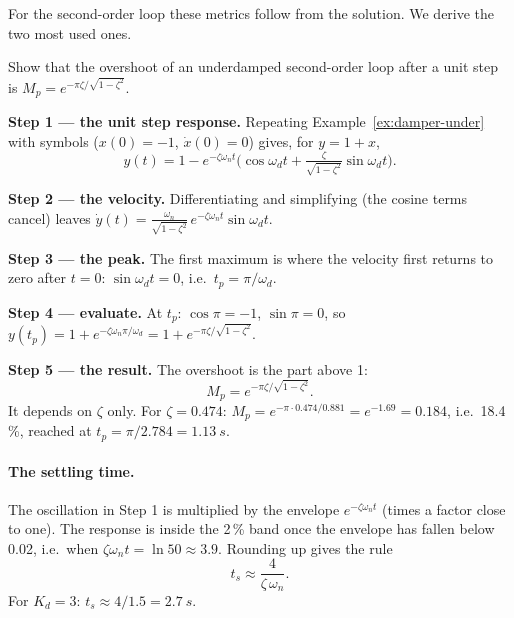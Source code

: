 For the second-order loop these metrics follow from the solution. We derive the two most used ones.

\begin{example}
\label{ex:damper-mp}
Show that the overshoot of an underdamped second-order loop after a unit step is $M_p = e^{-\pi\zeta/\sqrt{1-\zeta^2}}$.

\textbf{Step 1 — the unit step response.} Repeating Example~\ref{ex:damper-under} with symbols ($x(0) = -1$, $\dot x(0) = 0$) gives, for $y = 1 + x$,
\begin{equation*}
  y(t) = 1 - e^{-\zeta\omega_n t}\Big(\cos\omega_d t + \tfrac{\zeta}{\sqrt{1-\zeta^2}}\sin\omega_d t\Big).
\end{equation*}

\textbf{Step 2 — the velocity.} Differentiating and simplifying (the cosine terms cancel) leaves $\dot y(t) = \frac{\omega_n}{\sqrt{1-\zeta^2}}\,e^{-\zeta\omega_n t}\sin\omega_d t$.

\textbf{Step 3 — the peak.} The first maximum is where the velocity first returns to zero after $t = 0$: $\sin\omega_d t = 0$, i.e.\ $t_p = \pi/\omega_d$.

\textbf{Step 4 — evaluate.} At $t_p$: $\cos\pi = -1$, $\sin\pi = 0$, so $y(t_p) = 1 + e^{-\zeta\omega_n\pi/\omega_d} = 1 + e^{-\pi\zeta/\sqrt{1-\zeta^2}}$.

\textbf{Step 5 — the result.} The overshoot is the part above 1:
\begin{equation}\label{eq:damper-mp}
  M_p = e^{-\pi\zeta/\sqrt{1-\zeta^2}} .
\end{equation}
It depends on $\zeta$ only. For $\zeta = 0.474$: $M_p = e^{-\pi\cdot0.474/0.881} = e^{-1.69} = 0.184$, i.e.\ 18.4\,\%, reached at $t_p = \pi/2.784 = \SI{1.13}{s}$.
\end{example}

\paragraph{The settling time.} The oscillation in Step 1 is multiplied by the envelope $e^{-\zeta\omega_n t}$ (times a factor close to one). The response is inside the 2\,\% band once the envelope has fallen below 0.02, i.e.\ when $\zeta\omega_n t = \ln 50 \approx 3.9$. Rounding up gives the rule
\begin{equation}\label{eq:damper-ts}
  t_s \approx \frac{4}{\zeta\,\omega_n}.
\end{equation}
For $K_d = 3$: $t_s \approx 4/1.5 = \SI{2.7}{s}$.

